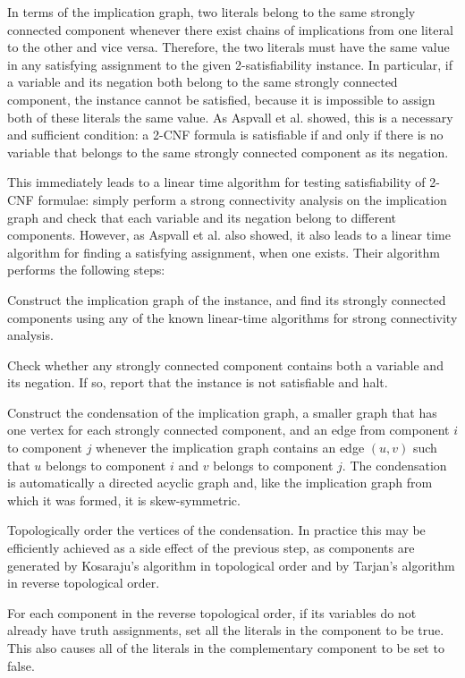 In terms of the implication graph, two literals belong to the same strongly connected component whenever there exist chains of implications from one literal to the other and vice versa. Therefore, the two literals must have the same value in any satisfying assignment to the given 2-satisfiability instance. In particular, if a variable and its negation both belong to the same strongly connected component, the instance cannot be satisfied, because it is impossible to assign both of these literals the same value. As Aspvall et al. showed, this is a necessary and sufficient condition: a 2-CNF formula is satisfiable if and only if there is no variable that belongs to the same strongly connected component as its negation.

This immediately leads to a linear time algorithm for testing satisfiability of 2-CNF formulae: simply perform a strong connectivity analysis on the implication graph and check that each variable and its negation belong to different components. However, as Aspvall et al. also showed, it also leads to a linear time algorithm for finding a satisfying assignment, when one exists. Their algorithm performs the following steps:

Construct the implication graph of the instance, and find its strongly connected components using any of the known linear-time algorithms for strong connectivity analysis.

Check whether any strongly connected component contains both a variable and its negation. If so, report that the instance is not satisfiable and halt.

Construct the condensation of the implication graph, a smaller graph that has one vertex for each strongly connected component, and an edge from component $i$ to component $j$ whenever the implication graph contains an edge $(u,v)$ such that $u$ belongs to component $i$ and $v$ belongs to component $j$. The condensation is automatically a directed acyclic graph and, like the implication graph from which it was formed, it is skew-symmetric.

Topologically order the vertices of the condensation. In practice this may be efficiently achieved as a side effect of the previous step, as components are generated by Kosaraju's algorithm in topological order and by Tarjan's algorithm in reverse topological order.

For each component in the reverse topological order, if its variables do not already have truth assignments, set all the literals in the component to be true. This also causes all of the literals in the complementary component to be set to false.
